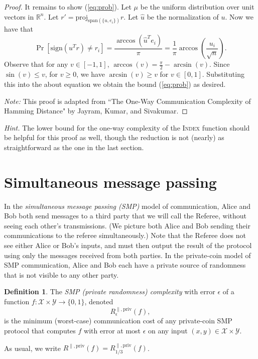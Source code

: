 \documentclass[11pt]{amsart}
\theoremstyle{plain}
\theoremstyle{definition}
\newtheorem{definition}{Definition}
\theoremstyle{plain}
\newcommand{\calX}{\mathcal{X}}
\newcommand{\calY}{\mathcal{Y}}
\newcommand{\R}{\mathbb{R}}
\begin{document}
\begin{proof}
It remains to show (\ref{eq:prob}). Let $\mu$ be the uniform distribution over unit vectors in $\R^n$. Let $r' = \text{proj}_{\text{span}(\{u,e_i\})}r.$
Let $\hat{u}$ be the normalization of $u$. Now we have that
$$\Pr[\text{sign}(u^Tr)\neq r_i] = \frac{\arccos(\hat{u}^Te_i)}{\pi} = \frac{1}{\pi}\arccos(\frac{u_i}{\sqrt{n}}).$$
Observe that for any $v \in [-1,1]$, $\arccos(v) = \frac{\pi}{2} - \arcsin(v)$. Since $\sin(v) \leq v$, for $v\geq 0$, we have $\arcsin(v) \geq v$ for $v \in [0,1]$. Substituting this into the about equation we obtain the bound (\ref{eq:prob}) as desired.

\emph{Note:} This proof is adapted from ``The One-Way Communication Complexity of Hamming Distance" by Jayram, Kumar, and Sivakumar.
\end{proof}

\bigskip
\emph{Hint.} The lower bound for the one-way complexity of the \textsc{Index} function should be helpful for this proof as well, though the reduction is not (nearly) as straightforward as the one in the last section.


\newpage 
\section{Simultaneous message passing}

In the \emph{simultaneous message passing (SMP)} model of communication, Alice and Bob both send messages to a third party that we will call the Referee, without seeing each other's transmissions. (We picture both Alice and Bob sending their communications to the referee simultaneously.) Note that the Referee does not see either Alice or Bob's inputs, and must then output the result of the protocol using only the messages received from both parties. In the private-coin model of SMP communication, Alice and Bob each have a private source of randomness that is not visible to any other party.

\begin{definition}
The \emph{SMP (private randomness) complexity} with error $\epsilon$ of a function $f : \calX \times \calY \to \{0,1\}$, denoted
\[
R^{\parallel,\mathrm{priv}}_\epsilon(f),
\] 
is the minimum (worst-case) communication cost of any private-coin SMP protocol that computes $f$ with error at most $\epsilon$ on any input $(x,y) \in \calX \times \calY$.
\end{definition}

As usual, we write $R^{\parallel,\mathrm{priv}}(f) = R^{\parallel,\mathrm{priv}}_{1/3}(f)$.
\end{document}
